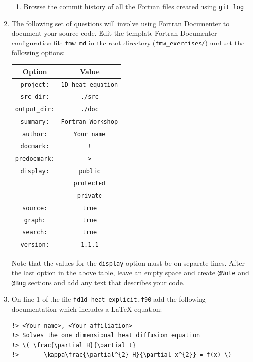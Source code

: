 \documentclass[12pt]{article}
\begin{document}
\begin{enumerate}
\begin{enumerate}
\item Browse the commit history of all the Fortran files created using \texttt{git log}
\end{enumerate}
\item The following set of questions will involve using Fortran Documenter to document your source code. 
Edit the template Fortran Documenter configuration file \texttt{fmw.md} in the root directory
(\texttt{fmw\_exercises/}) and set the following options:
\begin{center}
\begin{tabular}{| c | c |} \hline
{\bf Option} & {\bf Value} \\ \hline
\texttt{project:} & \texttt{1D heat equation} \\ \hline
\texttt{src\_dir:} & \texttt{./src} \\ \hline
\texttt{output\_dir:} & \texttt{./doc} \\ \hline
\texttt{summary:} & \texttt{Fortran Workshop} \\ \hline
\texttt{author:} & \texttt{Your name} \\ \hline
\texttt{docmark:} & \texttt{!} \\ \hline
\texttt{predocmark:} & \texttt{>} \\ \hline
\texttt{display:} & \texttt{public} \\ 
                  & \texttt{protected} \\ 
                  & \texttt{private} \\ \hline
\texttt{source:} & \texttt{true} \\ \hline
\texttt{graph:} & \texttt{true} \\ \hline
\texttt{search:} & \texttt{true} \\ \hline
\texttt{version:} & \texttt{1.1.1} \\ \hline
\end{tabular}
\end{center}
Note that the values for the \texttt{display} option must be on separate lines.
After the last option in the above table, leave an empty space and create \texttt{@Note} and \texttt{@Bug}
sections and add any text that describes your code.
\item On line 1 of the file \texttt{fd1d\_heat\_explicit.f90} add the following documentation which includes
  a LaTeX equation:
\begin{verbatim} 
!> <Your name>, <Your affiliation>
!> Solves the one dimensional heat diffusion equation
!> \( \frac{\partial H}{\partial t} 
!>     - \kappa\frac{\partial^{2} H}{\partial x^{2}} = f(x) \)

\end{verbatim}
\end{enumerate}
\end{document}
